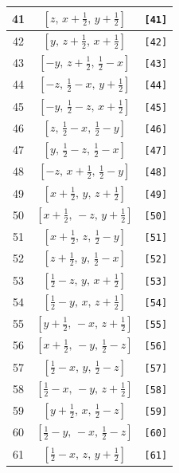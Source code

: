 \documentclass[fleqn,8pt]{jsarticle}
\begin{document}
\begin{longtable}{ccc}
41 & $\left[ z,\, x + \frac{1}{2},\, y + \frac{1}{2} \right]$ & {\tt [41]} \\ \hline
42 & $\left[ y,\, z + \frac{1}{2},\, x + \frac{1}{2} \right]$ & {\tt [42]} \\ \hline
43 & $\left[ - y,\, z + \frac{1}{2},\, \frac{1}{2} - x \right]$ & {\tt [43]} \\ \hline
44 & $\left[ - z,\, \frac{1}{2} - x,\, y + \frac{1}{2} \right]$ & {\tt [44]} \\ \hline
45 & $\left[ - y,\, \frac{1}{2} - z,\, x + \frac{1}{2} \right]$ & {\tt [45]} \\ \hline
46 & $\left[ z,\, \frac{1}{2} - x,\, \frac{1}{2} - y \right]$ & {\tt [46]} \\ \hline
47 & $\left[ y,\, \frac{1}{2} - z,\, \frac{1}{2} - x \right]$ & {\tt [47]} \\ \hline
48 & $\left[ - z,\, x + \frac{1}{2},\, \frac{1}{2} - y \right]$ & {\tt [48]} \\ \hline
49 & $\left[ x + \frac{1}{2},\, y,\, z + \frac{1}{2} \right]$ & {\tt [49]} \\ \hline
50 & $\left[ x + \frac{1}{2},\, - z,\, y + \frac{1}{2} \right]$ & {\tt [50]} \\ \hline
51 & $\left[ x + \frac{1}{2},\, z,\, \frac{1}{2} - y \right]$ & {\tt [51]} \\ \hline
52 & $\left[ z + \frac{1}{2},\, y,\, \frac{1}{2} - x \right]$ & {\tt [52]} \\ \hline
53 & $\left[ \frac{1}{2} - z,\, y,\, x + \frac{1}{2} \right]$ & {\tt [53]} \\ \hline
54 & $\left[ \frac{1}{2} - y,\, x,\, z + \frac{1}{2} \right]$ & {\tt [54]} \\ \hline
55 & $\left[ y + \frac{1}{2},\, - x,\, z + \frac{1}{2} \right]$ & {\tt [55]} \\ \hline
56 & $\left[ x + \frac{1}{2},\, - y,\, \frac{1}{2} - z \right]$ & {\tt [56]} \\ \hline
57 & $\left[ \frac{1}{2} - x,\, y,\, \frac{1}{2} - z \right]$ & {\tt [57]} \\ \hline
58 & $\left[ \frac{1}{2} - x,\, - y,\, z + \frac{1}{2} \right]$ & {\tt [58]} \\ \hline
59 & $\left[ y + \frac{1}{2},\, x,\, \frac{1}{2} - z \right]$ & {\tt [59]} \\ \hline
60 & $\left[ \frac{1}{2} - y,\, - x,\, \frac{1}{2} - z \right]$ & {\tt [60]} \\ \hline
61 & $\left[ \frac{1}{2} - x,\, z,\, y + \frac{1}{2} \right]$ & {\tt [61]} \\ \hline

\end{longtable}
\end{document}
